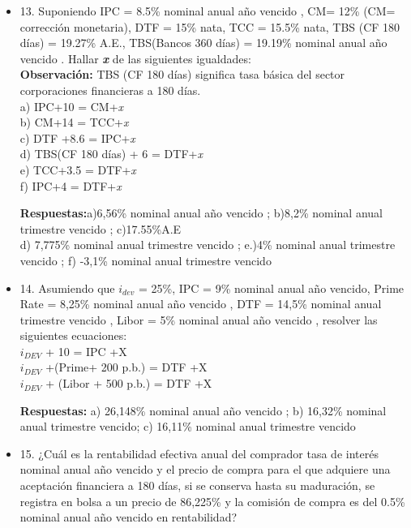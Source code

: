 \begin{itemize}
       \textbf{Respuestas:} a) 24.07\% nominal anual año vencido ; b)17.7\% nominal anual año vencido ; c) 13.57\% nominal anual año vencido  \\
       \medskip

 \item 13. Suponiendo IPC = 8.5\% nominal anual año vencido , CM= 12\% (CM= corrección monetaria), DTF = 15\% nata, TCC = 15.5\% nata, TBS (CF 180 días) = 19.27\% A.E., TBS(Bancos 360 días) = 19.19\% nominal anual año vencido . Hallar \textbf{\textit{x}} de las siguientes igualdades:\\
       \textbf{Observación:} TBS (CF 180 días) significa tasa básica del sector corporaciones financieras a 180 días.\\

       a) IPC+10 = CM+\textit{x}\\
       b) CM+14 = TCC+\textit{x}\\
       c) DTF +8.6 = IPC+\textit{x}\\
       d) TBS(CF 180 días) + 6 = DTF+\textit{x}\\
       e) TCC+3.5 = DTF+\textit{x}\\
       f) IPC+4 = DTF+\textit{x}
       
       \textbf{Respuestas:}a)6,56\% nominal anual año vencido ; b)8,2\% nominal anual trimestre vencido ; c)17.55\%A.E
       \\d) 7,775\% nominal anual trimestre vencido ; e.)4\% nominal anual trimestre vencido ; f) -3,1\% nominal anual trimestre vencido  \\
       \medskip

 \item 14. Asumiendo que $i_{dev}$  = 25\%, IPC = 9\% nominal anual año vencido, Prime Rate = 8,25\% nominal anual año vencido , DTF = 14,5\% nominal anual trimestre vencido , Libor = 5\% nominal anual año vencido , resolver las siguientes ecuaciones:\\
       $i_{DEV}$  + 10 = IPC +X\\
       $i_{DEV}$  +(Prime+ 200 p.b.) = DTF +X\\
       $i_{DEV}$  + (Libor + 500 p.b.) = DTF +X
       
       \textbf{Respuestas:}  a) 26,148\% nominal anual año vencido ; b) 16,32\% nominal anual trimestre vencido; c) 16,11\% nominal anual trimestre vencido \\
       \medskip

 \item 15. ¿Cuál es la rentabilidad efectiva anual del comprador tasa de interés nominal anual año vencido y el precio de compra para el que adquiere una aceptación financiera a 180 días, si se conserva hasta su maduración, se registra en bolsa a un precio de 86,225\% y la comisión de compra es del 0.5\% nominal anual año vencido en rentabilidad?
 

\end{itemize}
